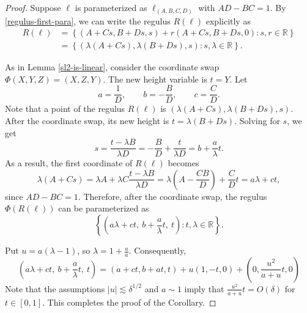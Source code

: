 \documentclass{amsart}%
\numberwithin{equation}{section}
\newcommand{\1}{\mathbbm{1}}
\begin{document}
\begin{proof}
Suppose $\ell$ is parameterized as $\ell_{(A,B,C,D)}$ with $AD-BC=1$.
By \eqref{regulus-first-para}, we can write the regulus $R(\ell)$ explicitly as
\begin{align}
\label{regulus-para-explicit}
    R(\ell)&=\left\{(A+Cs,B+Ds,s)+r(A+Cs,B+Ds,0):    s,r\in\mathbb R\right\}\\
    &=\left\{
    (\lambda(A+Cs),\lambda(B+Ds),s):
    s,\lambda\in\mathbb R
    \right\}.
\end{align}


As in Lemma \ref{sl2-is-linear}, consider the coordinate swap $\Phi(X,Y,Z)=(X,Z,Y)$.
The new height variable is $t=Y$. 
Let
\begin{equation}
    a=\frac1D,\qquad b=-\frac BD,\qquad c=\frac CD.
\end{equation}
Note that a point of the regulus $R(\ell)$ is $(\lambda(A+Cs),\lambda(B+Ds),s)$.
After the coordinate swap, its new height is $t=\lambda(B+Ds)$.
Solving for $s$, we get
\begin{equation}
    s=\frac{t-\lambda B}{\lambda D}
      =
      -\frac BD+\frac{t}{\lambda D}
      =
      b+\frac a\lambda t.
\end{equation}
As a result, the first coordinate of $R(\ell)$ becomes
\begin{equation}
        \lambda(A+Cs)
    =
    \lambda A+\lambda C\frac{t-\lambda B}{\lambda D}
    =
    \lambda\left(A-\frac{CB}{D}\right)+\frac CD t=a\lambda+ct,
\end{equation}
since $AD-BC=1$.
Therefore, after the coordinate swap, the regulus $\Phi(R(\ell))$ can be parameterized as
\begin{equation}
    \left\{
    \left(a\lambda+ct,\ b+\frac a\lambda t,\ t\right):
    t,\lambda\in\mathbb R
    \right\}.
\end{equation}

\smallskip 

Put $ u=a(\lambda-1)$, so $\lambda=1+\frac ua$.
Consequently,
\begin{equation}
    \left(a\lambda+ct,\ b+\frac a\lambda t,\ t\right)
    =
    (a+ct,b+at,t)+u(1,-t,0)
    +
    \left(0,\frac{u^2}{a+u}t,0\right)
\end{equation}
Note that the assumptions $|u|\lesssim \delta^{1/2}$ and $a\sim 1$ imply that $\frac{u^2}{a+u}t=O(\delta)$
for $t\in[0,1]$. 
This completes the proof of the Corollary.
\qedhere



\end{proof}
\end{document}
